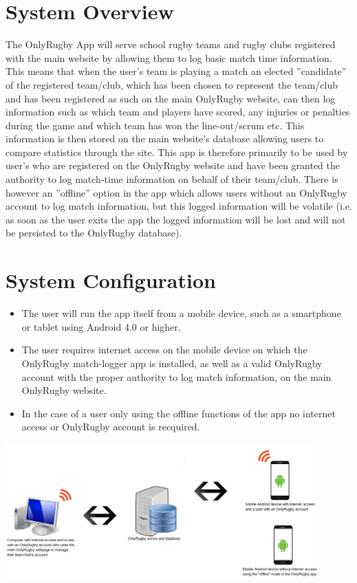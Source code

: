 \documentclass[hidelinks,a4paper,12pt]{article}
\begin{document}
\newpage
\section{System Overview} 
The OnlyRugby App will serve school rugby teams and rugby clubs registered with the main website by allowing them to log basic match time information. This means that when the user's team is playing a match an elected ''candidate'' of the registered team/club, which has been chosen to represent the team/club and has been registered as such on the main OnlyRugby website, can then log information such as which team and players have scored, any injuries or penalties during the game and which team has won the line-out/scrum etc. This information is then stored on the main website's database allowing users to compare statistics through the site. This app is therefore primarily to be used by user's who are registered on the OnlyRugby website and have been granted the authority to log match-time information on behalf of their team/club. There is however an ''offline'' option in the app which allows users without an OnlyRugby account to log match information, but this logged information will be volatile (i.e. as soon as the user exits the app the logged information will be lost and will not be persisted to the OnlyRugby database).
\section{System Configuration}
\begin {itemize}
	\item The user will run the app itself from a mobile device, such as a smartphone or tablet using Android 4.0 or higher.
	\item The user requires internet access on the mobile device on which the OnlyRugby match-logger app is installed, as well as a valid OnlyRugby account with the proper authority to log match information, on the main OnlyRugby website.
	\item In the case of a user only using the offline functions of the app no internet access or OnlyRugby account is recquired.
\end{itemize}
\begin{center}
  	 \includegraphics[width=0.9\textwidth] {./images/SystemConfiguration2.png}\\[0.4cm]
\end{center}
\end{document}
